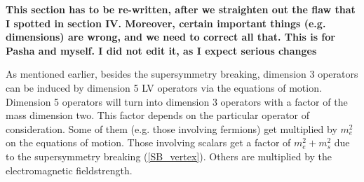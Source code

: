 \documentclass[12pt]{revtex4}
\begin{document}
{\bf This section has to be re-written, after we straighten out the 
flaw that I spotted in section IV. Moreover, certain important things (e.g. dimensions)
are wrong, and we need to correct all that. This is for Pasha and myself.
I did not edit it, as I expect serious changes}

As mentioned earlier, besides the supersymmetry breaking, 
dimension 3 operators can be induced by dimension 5 LV 
operators via the equations of motion.
Dimension 5 operators will turn into dimension 3 operators 
with a factor of the mass dimension two.
This factor depends on the particular operator of consideration.
Some of them (e.g. those involving fermions) 
get multiplied by $ m_e^2 $ on the equations of motion.
Those involving scalars get a factor of
$ m_e^2 + m_s^2 $
due to the supersymmetry breaking (\ref{SB_vertex}).
Others are multiplied by the electromagnetic fieldstrength.

\end{document}
